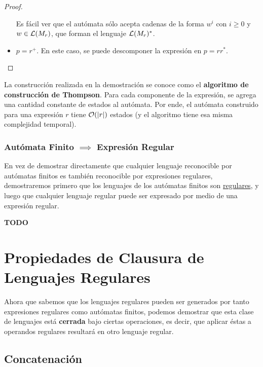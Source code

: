 \begin{proof}
\begin{itemize}
\begin{figure}[H]
        \end{figure}

        Es fácil ver que el autómata sólo acepta cadenas de la forma $w^i$ con $i \geq 0$ y $w \in \mathcal{L}(M_r)$, que forman el lenguaje $\mathcal{L}(M_r)^*$.

        \item $p = r^+$. En este caso, se puede descomponer la expresión en $p = rr^*$.
    \end{itemize}
\end{proof}

La construcción realizada en la demostración se conoce como el \textbf{algoritmo de construcción de Thompson}. Para cada componente de la expresión, se agrega una cantidad constante de estados al autómata. Por ende, el autómata construido para una expresión $r$ tiene $\mathcal{O}(|r|)$ estados (y el algoritmo tiene esa misma complejidad temporal).

\subsubsection{Autómata Finito $\implies$ Expresión Regular}

En vez de demostrar directamente que cualquier lenguaje reconocible por autómatas finitos es también reconocible por expresiones regulares, demostraremos primero que los lenguajes de los autómatas finitos son \hyperref[lenguaje-regular]{regulares}, y luego que cualquier lenguaje regular puede ser expresado por medio de una expresión regular.

\textbf{TODO}

\section{Propiedades de Clausura de Lenguajes Regulares}

Ahora que sabemos que los lenguajes regulares pueden ser generados por tanto expresiones regulares como autómatas finitos, podemos demostrar que esta clase de lenguajes está \textbf{cerrada} bajo ciertas operaciones, es decir, que aplicar éstas a operandos regulares resultará en otro lenguaje regular.

\subsection{Concatenación}

